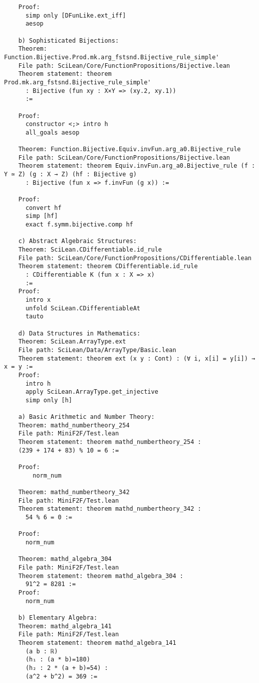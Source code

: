 \documentclass{article} %
\begin{document}
\begin{verbatim}
    Proof:
      simp only [DFunLike.ext_iff]
      aesop

    b) Sophisticated Bijections:
    Theorem: Function.Bijective.Prod.mk.arg_fstsnd.Bijective_rule_simple'
    File path: SciLean/Core/FunctionPropositions/Bijective.lean
    Theorem statement: theorem Prod.mk.arg_fstsnd.Bijective_rule_simple'
      : Bijective (fun xy : X×Y => (xy.2, xy.1))
      :=
    
    Proof:
      constructor <;> intro h
      all_goals aesop
    
    Theorem: Function.Bijective.Equiv.invFun.arg_a0.Bijective_rule
    File path: SciLean/Core/FunctionPropositions/Bijective.lean
    Theorem statement: theorem Equiv.invFun.arg_a0.Bijective_rule (f : Y ≃ Z) (g : X → Z) (hf : Bijective g)
      : Bijective (fun x => f.invFun (g x)) :=
    
    Proof:
      convert hf
      simp [hf]
      exact f.symm.bijective.comp hf

    c) Abstract Algebraic Structures:
    Theorem: SciLean.CDifferentiable.id_rule
    File path: SciLean/Core/FunctionPropositions/CDifferentiable.lean
    Theorem statement: theorem CDifferentiable.id_rule
      : CDifferentiable K (fun x : X => x)
      :=
    Proof:
      intro x
      unfold SciLean.CDifferentiableAt
      tauto

    d) Data Structures in Mathematics:
    Theorem: SciLean.ArrayType.ext
    File path: SciLean/Data/ArrayType/Basic.lean
    Theorem statement: theorem ext (x y : Cont) : (∀ i, x[i] = y[i]) → x = y :=
    Proof:
      intro h
      apply SciLean.ArrayType.get_injective
      simp only [h]

    a) Basic Arithmetic and Number Theory:
    Theorem: mathd_numbertheory_254
    File path: MiniF2F/Test.lean
    Theorem statement: theorem mathd_numbertheory_254 :
    (239 + 174 + 83) % 10 = 6 :=
    
    Proof:
        norm_num

    Theorem: mathd_numbertheory_342
    File path: MiniF2F/Test.lean
    Theorem statement: theorem mathd_numbertheory_342 :
      54 % 6 = 0 :=
    
    Proof:
      norm_num

    Theorem: mathd_algebra_304
    File path: MiniF2F/Test.lean
    Theorem statement: theorem mathd_algebra_304 :
      91^2 = 8281 :=
    Proof:
      norm_num

    b) Elementary Algebra:
    Theorem: mathd_algebra_141
    File path: MiniF2F/Test.lean
    Theorem statement: theorem mathd_algebra_141
      (a b : ℝ)
      (h₁ : (a * b)=180)
      (h₂ : 2 * (a + b)=54) :
      (a^2 + b^2) = 369 :=
    

\end{verbatim}
\end{document}

